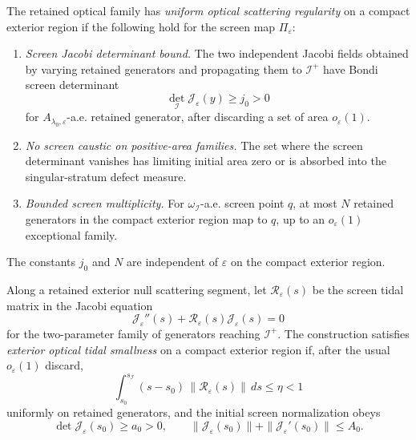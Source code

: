 \begin{definition}\label{def:OpticalScatteringRegularity}
The retained optical family has \emph{uniform optical scattering regularity} on a compact exterior region if the following hold for the screen map $\Pi_\varepsilon$:
\begin{enumerate}
    \item \emph{Screen Jacobi determinant bound.} The two independent Jacobi fields obtained by varying retained generators and propagating them to $\mathscr I^+$ have Bondi screen determinant
    \[
        \det_{\mathscr I}\mathcal J_\varepsilon(y)\ge j_0>0
    \]
    for $A_{\lambda_0,\varepsilon}$-a.e. retained generator, after discarding a set of area $o_\varepsilon(1)$.
    \item \emph{No screen caustic on positive-area families.} The set where the screen determinant vanishes has limiting initial area zero or is absorbed into the singular-stratum defect measure.
    \item \emph{Bounded screen multiplicity.} For $\omega_{\mathscr I}$-a.e. screen point $q$, at most $N$ retained generators in the compact exterior region map to $q$, up to an $o_\varepsilon(1)$ exceptional family.
\end{enumerate}
The constants $j_0$ and $N$ are independent of $\varepsilon$ on the compact exterior region.
\end{definition}

\begin{definition}\label{def:ExteriorOpticalTidalSmallness}
Along a retained exterior null scattering segment, let $\mathcal R_\varepsilon(s)$ be the screen tidal matrix in the Jacobi equation
\[
    \mathcal J_\varepsilon''(s)+\mathcal R_\varepsilon(s)\mathcal J_\varepsilon(s)=0
\]
for the two-parameter family of generators reaching $\mathscr I^+$. The construction satisfies \emph{exterior optical tidal smallness} on a compact exterior region if, after the usual $o_\varepsilon(1)$ discard,
\[
    \int_{s_0}^{s_{\mathscr I}}
    (s-s_0)\,\|\mathcal R_\varepsilon(s)\|\,ds
    \le \eta<1
\]
uniformly on retained generators, and the initial screen normalization obeys
\[
    \det \mathcal J_\varepsilon(s_0)\ge a_0>0,
    \qquad
    \|\mathcal J_\varepsilon(s_0)\|+\|\mathcal J_\varepsilon'(s_0)\|\le A_0 .
\]
\end{definition}

